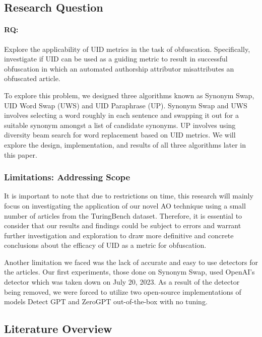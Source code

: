 \documentclass{article}
\begin{document}
\subsection{Research Question} 
\paragraph{RQ:}Explore the applicability of UID metrics in the task of obfuscation. Specifically, investigate if UID can be used as a guiding metric to result in successful obfuscation in which an automated authorship attributor misattributes an obfuscated article.

\hfill \break To explore this problem, we designed three algorithms known as Synonym Swap, UID Word Swap (UWS) and UID Paraphrase (UP). Synonym Swap and UWS involves selecting a word roughly in each sentence and swapping it out for a suitable synonym amongst a list of candidate synonyms. UP involves using diversity beam search for word replacement based on UID metrics. We will explore the design, implementation, and results of all three algorithms later in this paper.

\subsubsection{Limitations: Addressing Scope}
It is important to note that due to restrictions on time, this research will mainly focus on investigating the application of our novel AO technique using a small number of articles from the TuringBench dataset. Therefore, it is essential to consider that our results and findings could be subject to errors and warrant further investigation and exploration to draw more definitive and concrete conclusions about the efficacy of UID as a metric for obfuscation.

Another limitation we faced was the lack of accurate and easy to use detectors for the articles. Our first experiments, those done on Synonym Swap, used OpenAI's detector which was taken down on July 20, 2023. As a result of the detector being removed, we were forced to utilize two open-source implementations of models Detect GPT and ZeroGPT out-of-the-box with no tuning.

\subsection{Literature Overview}
\end{document}
